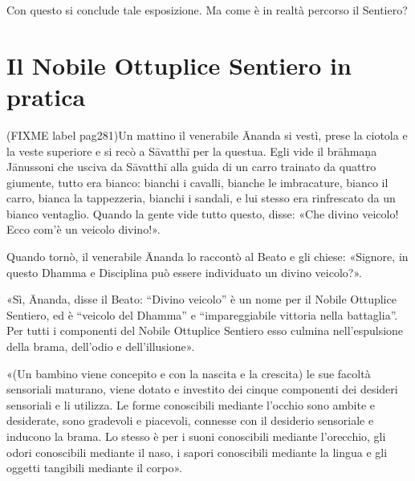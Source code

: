 

 Con questo si conclude tale esposizione. Ma come è in
realtà percorso il Sentiero?


\hypertarget{x-il-nobile-ottuplice-sentiero-in-pratica}{\section*{Il Nobile Ottuplice Sentiero in pratica}}
 (FIXME label pag281)Un mattino il venerabile Ānanda si vestì, prese la ciotola e
la veste superiore e si recò a Sāvatthī per la questua. Egli vide il
brāhmaṇa Jānussoni che usciva da Sāvatthī alla guida di un carro
trainato da quattro giumente, tutto era bianco: bianchi i cavalli,
bianche le imbracature, bianco il carro, bianca la tappezzeria, bianchi
i sandali, e lui stesso era rinfrescato da un bianco ventaglio. Quando
la gente vide tutto questo, disse: «Che divino veicolo! Ecco com’è un
veicolo divino!».


Quando tornò, il venerabile Ānanda lo raccontò al Beato e gli chiese:
«Signore, in questo Dhamma e Disciplina può essere individuato un divino
veicolo?».


«Sì, Ānanda, disse il Beato: “Divino veicolo” è un nome per il Nobile
Ottuplice Sentiero, ed è “veicolo del Dhamma” e “impareggiabile vittoria
nella battaglia”. Per tutti i componenti del Nobile Ottuplice Sentiero
esso culmina nell’espulsione della brama, dell’odio e dell’illusione».




«(Un bambino viene concepito e con la nascita e la crescita) le sue
facoltà sensoriali maturano, viene dotato e investito dei cinque
componenti dei desideri sensoriali e li utilizza. Le forme conoscibili
mediante l’occhio sono ambite e desiderate, sono gradevoli e piacevoli,
connesse con il desiderio sensoriale e inducono la brama. Lo stesso è
per i suoni conoscibili mediante l’orecchio, gli odori conoscibili
mediante il naso, i sapori conoscibili mediante la lingua e gli oggetti
tangibili mediante il corpo».


